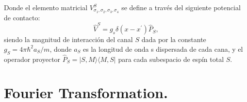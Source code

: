Donde el elemento matricial $ V_{\sigma_1, \sigma_2, \sigma_3, \sigma_4}^S$ se define a través del siguiente potencial de contacto:
\begin{equation}
    \hat{V}^{S} = g_s \delta (x-x^\prime) \hat{P}_S,
\end{equation}
siendo la magnitud de interacción del canal $S$ dada por la constante $g_S=4\pi\hbar^2 a_S /m $, donde $a_S$ es la longitud de onda s dispersada de cada cana, y el operador proyector $\hat{P}_S=|S, M\rangle\langle M, S|$ para cada subespacio de espín total $S$.
\section{Fourier Transformation.}